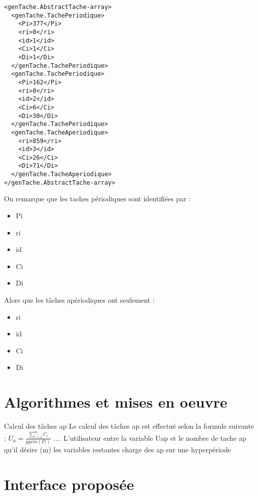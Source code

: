 \begin{lstlisting}
<genTache.AbstractTache-array>
  <genTache.TachePeriodique>
    <Pi>377</Pi>
    <ri>0</ri>
    <id>1</id>
    <Ci>1</Ci>
    <Di>1</Di>
  </genTache.TachePeriodique>
  <genTache.TachePeriodique>
    <Pi>162</Pi>
    <ri>0</ri>
    <id>2</id>
    <Ci>6</Ci>
    <Di>30</Di>
  </genTache.TachePeriodique>
  <genTache.TacheAperiodique>
    <ri>859</ri>
    <id>3</id>
    <Ci>26</Ci>
    <Di>71</Di>
  </genTache.TacheAperiodique>
</genTache.AbstractTache-array>
\end{lstlisting}
On remarque que les taches périodiques sont identifiées par : 
\begin{itemize}
\item
Pi 
\item
ri 
\item
id 
\item
Ci
\item
Di  
\end{itemize} 
Alors que les tâches apériodiques ont seulement : 
\begin{itemize}
\item
ri 
\item
id 
\item
Ci
\item
Di 
\end{itemize} 
\section{Algorithmes et mises en oeuvre}

Calcul des tâches ap  
Le calcul des tâches ap est effectué selon la formule suivante : $ U_a =  \frac{\sum_{i=1}^m C_i}{ppcm(P_i)}$   ....  L'utilisateur entre la variable Uap  et le nombre de tache ap qu'il désire (m) les variables restantes 
charge des ap sur une hyperpériode 
\section{Interface proposée}

